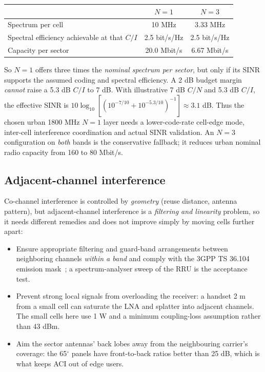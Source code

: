 \documentclass[9pt,a4paper]{extarticle}
\begin{document}
\begin{center}\small
\begin{tabular}{@{}lcc@{}}
\toprule
& $N=1$ & $N=3$ \\
\midrule
Spectrum per cell & 10 MHz & 3.33 MHz \\
Spectral efficiency achievable at that $C/I$ & 2.5 bit/s/Hz & 2.5 bit/s/Hz \\
Capacity per sector & 20.0 Mbit/s & 6.67 Mbit/s \\
\bottomrule
\end{tabular}
\end{center}

So $N=1$ offers three times the \emph{nominal spectrum per sector}, but only if its
SINR supports the assumed coding and spectral efficiency. A 2 dB budget margin
\emph{cannot} raise a 5.3 dB $C/I$ to 7 dB. With illustrative 7 dB $C/N$
and 5.3 dB $C/I$, the effective SINR is
$10\log_{10}[(10^{-7/10}+10^{-5.3/10})^{-1}]\approx3.1$ dB.
Thus the chosen urban 1800 MHz $N=1$ layer needs a lower-code-rate cell-edge
mode, inter-cell interference coordination and actual SINR validation. An $N=3$
configuration on \emph{both} bands is the conservative fallback; it reduces urban
nominal radio capacity from 160 to 80 Mbit/s.

\subsection{Adjacent-channel interference}
Co-channel interference is controlled by \emph{geometry} (reuse distance, antenna pattern), but
adjacent-channel interference is a \emph{filtering and linearity} problem, so it needs different
remedies and does not improve simply by moving cells further apart:

\begin{itemize}[leftmargin=1.4em,itemsep=1pt,topsep=2pt]
\item Ensure appropriate filtering and guard-band arrangements between neighboring
channels \emph{within a band} and comply with the 3GPP TS 36.104 emission mask~\cite{ts36104}; a spectrum-analyser sweep of the RRU is the
acceptance test.
\item Prevent strong local signals from overloading the receiver: a handset 2 m from a small cell
can saturate the LNA and splatter into adjacent channels. The small cells here use 1 W and a
minimum coupling-loss assumption rather than 43 dBm.
\item Aim the sector antennas' back lobes away from the neighbouring carrier's coverage: the
65$^\circ$ panels have front-to-back ratios better than 25 dB, which is what keeps ACI out of
edge users.
\end{itemize}
\end{document}
